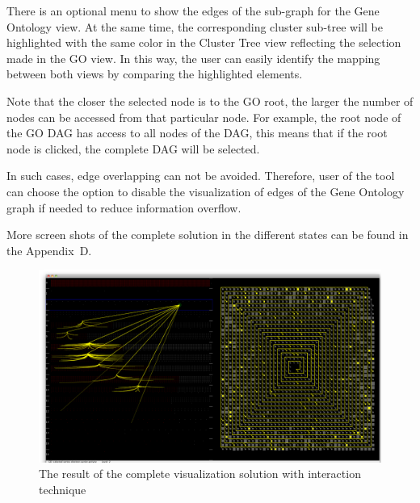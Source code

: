 There is an optional menu to show the edges of the sub-graph for the Gene Ontology view. At the same time, the corresponding cluster sub-tree will be highlighted with the same color in the Cluster Tree view reflecting the selection made in the GO view. In this way, the user can easily identify the mapping between both views by comparing the highlighted elements.


Note that the closer the selected node is to the GO root, the larger the number of nodes can be accessed from that particular node.
For example, the root node of the GO DAG has access to all nodes of the DAG, this means that if the root node is clicked, the complete DAG will be selected.


In such cases, edge overlapping can not be avoided. Therefore, user of the tool can choose the option to disable the visualization of edges of the Gene Ontology graph if needed to reduce information overflow.


More screen shots of the complete solution in the different states can be found in the Appendix~D.

\newpage
\begin{figure}[h!]
\centering
\includegraphics[scale=0.33, angle=90]{pictures/complete_solution_overview.png}
\caption{The result of the complete visualization solution with interaction technique}
\label{fig:complete_solution_overview}
\end{figure}